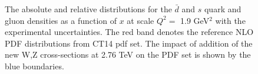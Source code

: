 \begin{figure}[!tbp]
\begin{minipage}[h]{0.43\linewidth}
\end{minipage}
\hfill
\begin{minipage}[h]{0.43\linewidth}
\end{minipage}
\vfill
\begin{minipage}[h]{0.43\linewidth}
\end{minipage}
\hfill
\begin{minipage}[h]{0.43\linewidth}
\end{minipage}
\vfill
\begin{minipage}[h]{0.43\linewidth}
\end{minipage}
\hfill
\begin{minipage}[h]{0.43\linewidth}
\end{minipage}
\caption{The absolute and  relative distributions for the $\bar{d}$ and $s$ quark and gluon densities as a function of $x$ at scale $Q^2=$ 1.9 GeV$^2$ with the experimental uncertainties. The red band denotes the reference NLO PDF distributions from CT14 pdf set. The impact of addition of the new W,Z cross-sections at 2.76 TeV on the PDF set is shown by the blue boundaries.}
\label{fig:PDFSeaShift}
\end{figure}



